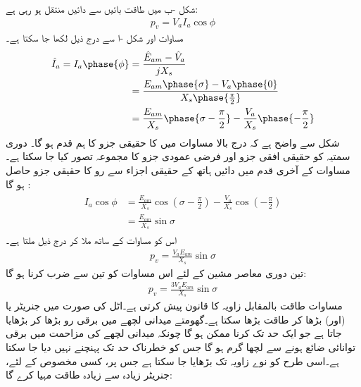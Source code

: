  شکل -ب میں طاقت  بائیں سے دائیں منتقل ہو رہی ہے:
\begin{align}\label{مساوات_معاصر_طاقت_کی_منتقلی_الف}
p_v=V_a I_a \cos \phi
\end{align}
مساوات  اور شکل -ا  سے درج ذیل لکھا جا سکتا ہے۔
\begin{gather}
\begin{aligned}\label{مساوات_معاصر_رو_بالمقابل_دو_دباو}
\hat{I}_a=I_a \phase{\phi}&=\frac{\hat{E}_{am}-\hat{V}_a}{j X_s}\\
&=\frac{E_{am} \phase{\sigma} -V_a \phase {0}}{X_s \phase{\frac{\pi}{2}}}\\
&=\frac{E_{am}}{X_s} \phase{\sigma-\frac{\pi}{2}} -\frac{V_a}{X_s} \phase {-\frac{\pi}{2}}
\end{aligned}
\end{gather}
شکل  سے واضح ہے کہ درج بالا مساوات میں  کا حقیقی جزو   کا ہم قدم ہو گا۔   دوری سمتیہ  کو  حقیقی افقی جزو  اور فرضی عمودی جزو  کا مجموعہ تصور کیا جا سکتا ہے۔ مساوات  کے آخری قدم میں دائیں ہاتھ کے حقیقی اجزاء سے رو کا حقیقی جزو حاصل ہو گا :
\begin{gather}
\begin{aligned}
I_a \cos \phi&=\frac{E_{am}}{X_s} \cos \left(\sigma -\frac{\pi}{2} \right)-\frac{V_a}{X_s} \cos \left(-\frac{\pi}{2} \right)\\
&=\frac{E_{am}}{X_s} \sin \sigma
\end{aligned}
\end{gather}
اس کو مساوات   کے ساتھ ملا کر درج ذیل ملتا ہے۔
\begin{align}\label{مساوات_معاصر_سائن_خصوصیات}
p_v=\frac{V_a E_{am}}{X_s} \sin \sigma
\end{align}
تین دوری معاصر مشین کے لئے اس مساوات کو تین سے ضرب کرنا ہو گا:
\begin{align}\label{مساوات_معاصر_طاقت_بالمقابل_زاویہ}
p_v=\frac{3 V_a E_{am}}{X_s} \sin \sigma
\end{align}
مساوات  طاقت بالمقابل زاویہ کا قانون پیش کرتی ہے۔اٹل  کی صورت میں جنریٹر  یا (اور)  بڑھا کر طاقت بڑھا سکتا ہے۔گھومتے میدانی لچھے میں برقی رو بڑھا کر   بڑھایا جاتا ہے جو ایک حد تک کرنا ممکن ہو گا چونکہ میدانی  لچھے کی مزاحمت میں برقی توانائی ضائع ہونے سے لچھا گرم ہو گا جس کو خطرناک حد تک پہنچنے نہیں دیا جا سکتا ہے۔اسی طرح   کو نوے زاویہ تک بڑھایا  جا سکتا ہے جس پر، کسی مخصوص  کے لئے، جنریٹر زیادہ سے زیادہ طاقت مہیا کرے گا:
